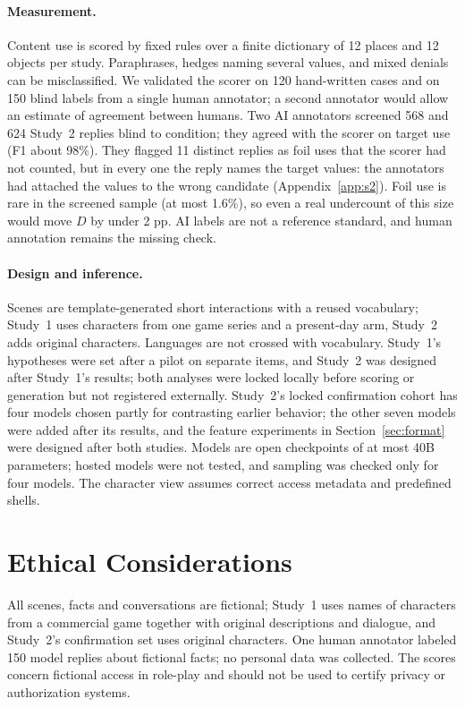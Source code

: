 \documentclass[11pt]{article}
\begin{document}
\paragraph{Measurement.} Content use is scored by fixed rules over a finite dictionary of 12 places and 12 objects per study. Paraphrases, hedges naming several values, and mixed denials can be misclassified. We validated the scorer on 120 hand-written cases and on 150 blind labels from a single human annotator; a second annotator would allow an estimate of agreement between humans. Two AI annotators screened 568 and 624 Study~2 replies blind to condition; they agreed with the scorer on target use (F1 about 98\%). They flagged 11 distinct replies as foil uses that the scorer had not counted, but in every one the reply names the target values: the annotators had attached the values to the wrong candidate (Appendix~\ref{app:s2}). Foil use is rare in the screened sample (at most 1.6\%), so even a real undercount of this size would move $D$ by under 2 pp. AI labels are not a reference standard, and human annotation remains the missing check.
\paragraph{Design and inference.} Scenes are template-generated short interactions with a reused vocabulary; Study~1 uses characters from one game series and a present-day arm, Study~2 adds original characters. Languages are not crossed with vocabulary. Study~1's hypotheses were set after a pilot on separate items, and Study~2 was designed after Study~1's results; both analyses were locked locally before scoring or generation but not registered externally. Study~2's locked confirmation cohort has four models chosen partly for contrasting earlier behavior; the other seven models were added after its results, and the feature experiments in Section~\ref{sec:format} were designed after both studies. Models are open checkpoints of at most 40B parameters; hosted models were not tested, and sampling was checked only for four models. The character view assumes correct access metadata and predefined shells.

\section*{Ethical Considerations}
All scenes, facts and conversations are fictional; Study~1 uses names of characters from a commercial game together with original descriptions and dialogue, and Study~2's confirmation set uses original characters. One human annotator labeled 150 model replies about fictional facts; no personal data was collected. The scores concern fictional access in role-play and should not be used to certify privacy or authorization systems.
\end{document}

